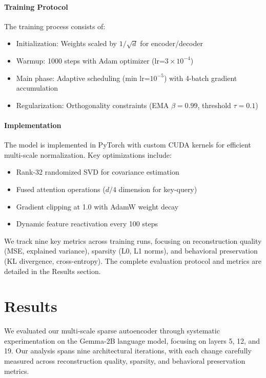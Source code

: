\documentclass{article} %
\begin{document}
\paragraph{Training Protocol} The training process consists of:
\begin{itemize}
    \item Initialization: Weights scaled by $1/\sqrt{d}$ for encoder/decoder
    \item Warmup: 1000 steps with Adam optimizer (lr=$3\times10^{-4}$)
    \item Main phase: Adaptive scheduling (min lr=$10^{-5}$) with 4-batch gradient accumulation
    \item Regularization: Orthogonality constraints (EMA $\beta=0.99$, threshold $\tau=0.1$)
\end{itemize}

\paragraph{Implementation} The model is implemented in PyTorch with custom CUDA kernels for efficient multi-scale normalization. Key optimizations include:
\begin{itemize}
    \item Rank-32 randomized SVD for covariance estimation
    \item Fused attention operations ($d/4$ dimension for key-query)
    \item Gradient clipping at 1.0 with AdamW weight decay
    \item Dynamic feature reactivation every 100 steps
\end{itemize}

We track nine key metrics across training runs, focusing on reconstruction quality (MSE, explained variance), sparsity (L0, L1 norms), and behavioral preservation (KL divergence, cross-entropy). The complete evaluation protocol and metrics are detailed in the Results section.

\section{Results}
\label{sec:results}

We evaluated our multi-scale sparse autoencoder through systematic experimentation on the Gemma-2B language model, focusing on layers 5, 12, and 19. Our analysis spans nine architectural iterations, with each change carefully measured across reconstruction quality, sparsity, and behavioral preservation metrics.
\end{document}
